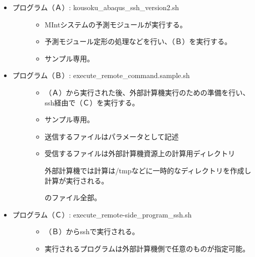 \documentclass[letterpaper,10pt,dvipdfmx,openany]{sphinxmanual}
\begin{document}
\begin{itemize}
\item {} \begin{description}
\item[{プログラム（Ａ）: kousoku\_abaqus\_ssh\_version2.sh}] \leavevmode\begin{itemize}
\item {} 
MIntシステムの予測モジュールが実行する。

\item {} 
予測モジュール定形の処理などを行い、（Ｂ）を実行する。

\item {} 
サンプル専用。

\end{itemize}

\end{description}

\item {} \begin{description}
\item[{プログラム（Ｂ）: execute\_remote\_command.sample.sh}] \leavevmode\begin{itemize}
\item {} 
（Ａ）から実行された後、外部計算機実行のための準備を行い、ssh経由で（Ｃ）を実行する。

\item {} 
サンプル専用。

\item {} 
送信するファイルはパラメータとして記述

\item {} 
受信するファイルは外部計算機資源上の計算用ディレクトリ %
\begin{footnote}[1]\sphinxAtStartFootnote
外部計算機では計算は/tmpなどに一時的なディレクトリを作成し計算が実行される。
%
\end{footnote} のファイル全部。

\end{itemize}

\end{description}

\item {} \begin{description}
\item[{プログラム（Ｃ）: execute\_remote-side\_program\_ssh.sh}] \leavevmode\begin{itemize}
\item {} 
（Ｂ）からsshで実行される。

\item {} 
実行されるプログラムは外部計算機側で任意のものが指定可能。


\end{itemize}
\end{description}
\end{itemize}
\end{document}
